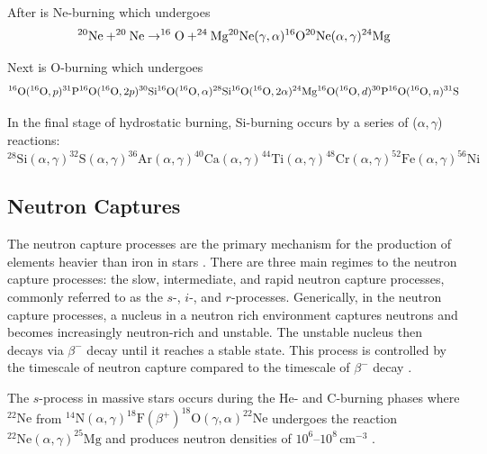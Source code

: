 After is Ne-burning which undergoes
\[
    ^{20}\mathrm{Ne} + ^{20} \mathrm{Ne} \rightarrow ^{16}\mathrm{O} + ^{24}\mathrm{Mg}\\
    ^{20}\mathrm{Ne}(\gamma,\alpha)^{16}\mathrm{O} \\ 
    ^{20}\mathrm{Ne}(\alpha,\gamma)^{24}\mathrm{Mg}
\]

Next is O-burning which undergoes
\[
    ^{16}\mathrm{O}(^{16}\mathrm{O},p)^{31}\mathrm{P} \\
    ^{16}\mathrm{O}(^{16}\mathrm{O},2p)^{30}\mathrm{Si} \\
    ^{16}\mathrm{O}(^{16}\mathrm{O},\alpha)^{28}\mathrm{Si} \\
    ^{16}\mathrm{O}(^{16}\mathrm{O},2\alpha)^{24}\mathrm{Mg} \\
    ^{16}\mathrm{O}(^{16}\mathrm{O},d)^{30}\mathrm{P} \\
    ^{16}\mathrm{O}(^{16}\mathrm{O},n)^{31}\mathrm{S} \\
\]

In the final stage of hydrostatic burning, Si-burning occurs by a series of ($\alpha, \gamma$) reactions:
\[
    ^{28}\mathrm{Si}(\alpha,\gamma)^{32}\mathrm{S}(\alpha,\gamma)^{36}\mathrm{Ar}(\alpha,\gamma)^{40}\mathrm{Ca}(\alpha,\gamma)^{44}\mathrm{Ti}(\alpha,\gamma)^{48}\mathrm{Cr}(\alpha,\gamma)^{52}\mathrm{Fe}(\alpha,\gamma)^{56}\mathrm{Ni}
\]

\subsection{Neutron Captures}

The neutron capture processes are the primary mechanism for the production of elements heavier than iron in stars \citep{burbidgeSynthesisElementsStars1957}.
There are three main regimes to the neutron capture processes: the slow, intermediate, and rapid neutron capture processes, commonly referred to as the $s$-, $i$-, and $r$-processes.
Generically, in the neutron capture processes, a nucleus in a neutron rich environment captures neutrons and becomes increasingly neutron-rich and unstable. 
The unstable nucleus then decays via $\beta^-$ decay until it reaches a stable state.
This process is controlled by the timescale of neutron capture compared to the timescale of $\beta^-$ decay \citep{burbidgeSynthesisElementsStars1957, iliadisNuclearPhysicsStars2015}.


The $s$-process in massive stars occurs during the He- and C-burning phases where $^{22}\mathrm{Ne}$ from $^{14}\mathrm{N}(\alpha,\gamma)^{18}\mathrm{F}(\beta^+)^{18}\mathrm{O}(\gamma,\alpha)^{22}\mathrm{Ne}$ undergoes the reaction $^{22}\mathrm{Ne}(\alpha,\gamma)^{25}\mathrm{Mg}$ and produces neutron densities of $10^6\text{–}10^8\,\mathrm{cm}^{-3}$ \citep{pignatariWEAKSPROCESSMASSIVE2010,kappelerProcessNuclearPhysics2011}.

